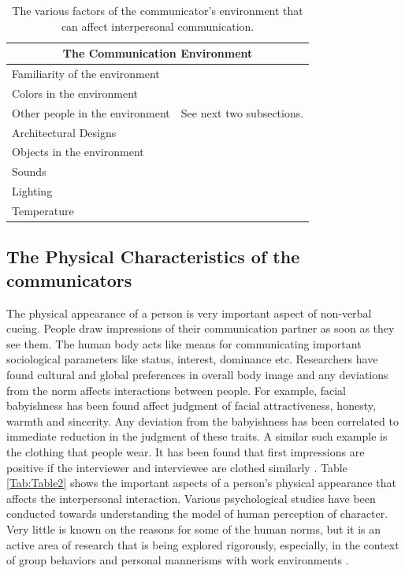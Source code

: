 \documentclass[oneside,11pt]{memoir}
\begin{document}
\begin{table}[hpdf]
\begin{center}
\caption{The various factors of the communicator's environment that can affect interpersonal communication.}
\label{Tab:Tabel1}
\begin{tabular}{|l|l|}
\hline
\multicolumn{2}{|c|}{The Communication Environment} \\
\hline
Familiarity of the environment & \cite{sommer_personal_1969} \cite{sommer_tight_1974} \\
Colors in the environment & \cite{schauss_psysiological_1985} \cite{bottomley_interactive_2006} \\
Other people in the environment	& See next two subsections. \\
Architectural Designs & \cite{farrenkopf_university_1980} \\
Objects in the environment & \cite{moos_human_1985} \\
Sounds  & \cite{manusov_attribution_2001} \cite{north_-store_1997} \\
Lighting & \cite{meer_light_1985} \\
Temperature & \cite{kenrick_ambient_1986} \\
\hline
\end{tabular}
\end{center}
\end{table}

\subsection{The Physical Characteristics of the communicators}
The physical appearance of a person is very important aspect of non-verbal cueing. People draw impressions of their communication partner as soon as they see them. The human body acts like means for communicating important sociological parameters like status, interest, dominance etc. Researchers have found cultural and global preferences in overall body image and any deviations from the norm affects interactions between people. For example, facial babyishness \cite{berry_attractive_1991} has been found affect judgment of facial attractiveness, honesty, warmth and sincerity. Any deviation from the babyishness has been correlated to immediate reduction in the judgment of these traits. A similar such example is the clothing that people wear. It has been found that first impressions are positive if the interviewer and interviewee are clothed similarly \cite{johnson_clothing_1977}. Table \ref{Tab:Table2} shows the important aspects of a person's physical appearance that affects the interpersonal interaction. Various psychological studies have been conducted towards understanding the model of human perception of character. Very little is known on the reasons for some of the human norms, but it is an active area of research that is being explored rigorously, especially, in the context of group behaviors and personal mannerisms with work environments \cite{helen_h._jennings_sociometry_1959}.
\end{document}
